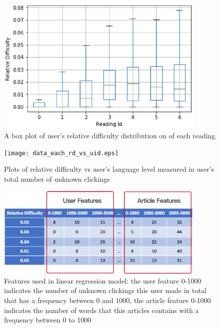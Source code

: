 \begin{figure}[tbp]
 \begin{center}
  \includegraphics[width=100mm]{data_all_RD_rid.eps}
 \end{center}
 \caption{\label{figure:all_RD_rid} A box plot of user's relative difficulty distribution on of each reading}
\end{figure}

\begin{figure}[tbp]
 \begin{center}
  \texttt{[image: data\_each\_rd\_vs\_uid.eps]}
 \end{center}
 \caption{\label{figure:each_rd_vs_uid} Plots of relative difficulty vs user's language level measured in user's total number of unknown clickings}
\end{figure}

\begin{figure}[tbp]
 \begin{center}
  \includegraphics[width=100mm]{linear_features.eps}
 \end{center}
 \caption{\label{figure:linear_features} Features used in linear regression model: the user feature 0-1000 indicates the number of unknown clickings this user made in total that has a frequency between 0 and 1000, the article feature 0-1000 indicates the number of words that this articles contains with a frequency between 0 to 1000}
\end{figure}

